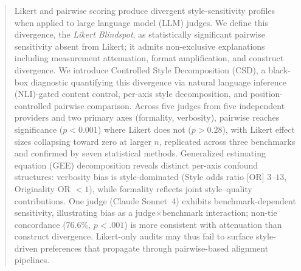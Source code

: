 \begin{abstract}
Likert and pairwise scoring produce divergent style-sensitivity profiles when applied to large language model (LLM) judges.
We define this divergence, the \emph{Likert Blindspot}, as statistically significant pairwise sensitivity absent from Likert; it admits non-exclusive explanations including measurement attenuation, format amplification, and construct divergence.
We introduce Controlled Style Decomposition (CSD), a black-box diagnostic quantifying this divergence via natural language inference (NLI)-gated content control, per-axis style decomposition, and position-controlled pairwise comparison.
Across five judges from five independent providers and two primary axes (formality, verbosity), pairwise reaches significance ($p < 0.001$) where Likert does not ($p > 0.28$), with Likert effect sizes collapsing toward zero at larger $n$, replicated across three benchmarks and confirmed by seven statistical methods.
Generalized estimating equation (GEE) decomposition reveals distinct per-axis confound structures: verbosity bias is style-dominated (Style odds ratio [OR] $3$--$13$, Originality OR ${<}1$), while formality reflects joint style--quality contributions.
One judge (Claude Sonnet~4) exhibits benchmark-dependent sensitivity, illustrating bias as a judge$\times$benchmark interaction; non-tie concordance (76.6\%, $p < .001$) is more consistent with attenuation than construct divergence.
Likert-only audits may thus fail to surface style-driven preferences that propagate through pairwise-based alignment pipelines.
\end{abstract}
